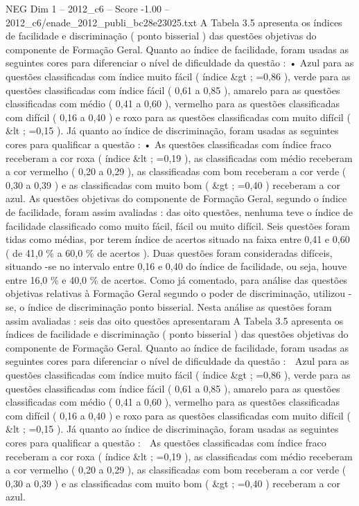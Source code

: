 \begin{textsample}{NEG Dim 1 – 2012\_c6 – Score -1.00 – 2012\_c6/enade\_2012\_publi\_bc28e23025.txt}
A Tabela 3.5 apresenta os índices de facilidade e discriminação ( ponto bisserial ) das questões objetivas do componente de Formação Geral.
Quanto ao índice de facilidade, foram usadas as seguintes cores para diferenciar o nível de dificuldade da questão : • Azul para as questões classificadas com índice muito fácil ( índice \&gt ; =0,86 ), verde para as questões classificadas com índice fácil ( 0,61 a 0,85 ), amarelo para as questões classificadas com médio ( 0,41 a 0,60 ), vermelho para as questões classificadas com difícil ( 0,16 a 0,40 ) e roxo para as questões classificadas com muito difícil ( \&lt ; =0,15 ).
Já quanto ao índice de discriminação, foram usadas as seguintes cores para qualificar a questão : • As questões classificadas com índice fraco receberam a cor roxa ( índice \&lt ; =0,19 ), as classificadas com médio receberam a cor vermelho ( 0,20 a 0,29 ), as classificadas com bom receberam a cor verde ( 0,30 a 0,39 ) e as classificadas com muito bom ( \&gt ; =0,40 ) receberam a cor azul.
As questões objetivas do componente de Formação Geral, segundo o índice de facilidade, foram assim avaliadas : das oito questões, nenhuma teve o índice de facilidade classificado como muito fácil, fácil ou muito difícil.
Seis questões foram tidas como médias, por terem índice de acertos situado na faixa entre 0,41 e 0,60 ( de 41,0 \% a 60,0 \% de acertos ).
Duas questões foram consideradas difíceis, situando -se no intervalo entre 0,16 e 0,40 do índice de facilidade, ou seja, houve entre 16,0 \% e 40,0 \% de acertos.
Como já comentado, para análise das questões objetivas relativas à Formação Geral segundo o poder de discriminação, utilizou -se, o índice de discriminação ponto bisserial.
Nesta análise as questões foram assim avaliadas : seis das oito questões apresentaram A Tabela 3.5 apresenta os índices de facilidade e discriminação ( ponto bisserial ) das questões objetivas do componente de Formação Geral.
Quanto ao índice de facilidade, foram usadas as seguintes cores para diferenciar o nível de dificuldade da questão :  Azul para as questões classificadas com índice muito fácil ( índice \&gt ; =0,86 ), verde para as questões classificadas com índice fácil ( 0,61 a 0,85 ), amarelo para as questões classificadas com médio ( 0,41 a 0,60 ), vermelho para as questões classificadas com difícil ( 0,16 a 0,40 ) e roxo para as questões classificadas com muito difícil ( \&lt ; =0,15 ).
Já quanto ao índice de discriminação, foram usadas as seguintes cores para qualificar a questão :  As questões classificadas com índice fraco receberam a cor roxa ( índice \&lt ; =0,19 ), as classificadas com médio receberam a cor vermelho ( 0,20 a 0,29 ), as classificadas com bom receberam a cor verde ( 0,30 a 0,39 ) e as classificadas com muito bom ( \&gt ; =0,40 ) receberam a cor azul.

\end{textsample}
